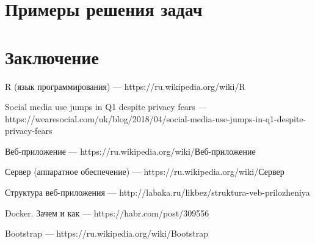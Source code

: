 \documentclass[14pt,a4paper]{scrartcl}
\begin{document}
    \newpage
    \section[Примеры решения задач]{Примеры решения задач}

    \newpage
    \section[Заключение]{Заключение}

    \newpage
    \begin{thebibliography}{9}
        R (язык программирования)
        \newblock --- https://ru.wikipedia.org/wiki/R

        Social media use jumps in Q1 despite privacy fears
        \newblock --- https://wearesocial.com/uk/blog/2018/04/social-media-use-jumps-in-q1-despite-privacy-fears

        Веб-приложение
        \newblock --- https://ru.wikipedia.org/wiki/Веб-приложение

        Сервер (аппаратное обеспечение)
        \newblock --- https://ru.wikipedia.org/wiki/Сервер

        Структура веб-приложения
        \newblock --- http://labaka.ru/likbez/struktura-veb-prilozheniya

        Docker. Зачем и как
        \newblock --- https://habr.com/post/309556

        Bootstrap
        \newblock --- https://ru.wikipedia.org/wiki/Bootstrap

    \end{thebibliography}

    \newpage
    \appendix
\end{document}

